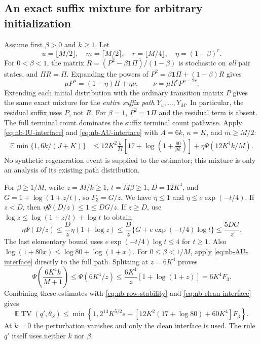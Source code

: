 \subsection{An exact suffix mixture for arbitrary initialization}
Assume first $\beta>0$ and $k\geq1$.  Let
\[
 u=\lfloor M/2\rfloor,\quad m=\lceil M/2\rceil,\quad
 r=\lfloor M/4\rfloor,\quad \eta=(1-\beta)^r.
\]
For $0<\beta<1$, the matrix
$R=(P^2-\beta\mathbf1\Pi)/(1-\beta)$ is stochastic on \emph{all}
pair states, and $\Pi R=\Pi$.  Expanding the powers of
$P^2=\beta\mathbf1\Pi+(1-\beta)R$ gives
\begin{equation}\label{eq:nb-suffix-mixture}
 \mu P^u=(1-\eta)\Pi+\eta\nu,
 \qquad \nu=\mu R^rP^{u-2r}.
\end{equation}
Extending each initial distribution with the ordinary transition matrix
$P$ gives the same exact mixture for the \emph{entire suffix path}
$Y_u,\ldots,Y_M$.  In particular, the residual suffix uses $P$, not $R$.
For $\beta=1$, $P^2=\mathbf1\Pi$ and the residual term is absent.
The full terminal count dominates the suffix terminal count pathwise.
Apply \eqref{eq:nb-IU-interface} and \eqref{eq:nb-AU-interface} with
$A=6k$, $\kappa=K$, and $m\geq M/2$:
\begin{align}\label{eq:nb-suffix-bound}
 \mathbb E\min\{1,6k/(J+K)\}
 &\leq12K^2\frac{k}{M}
 \left[17+\log\left(1+\frac{80}{\beta k}\right)\right]
 +\eta\Psi(12K^4k/M).
\end{align}
No synthetic regeneration event is supplied to the estimator; this
mixture is only an analysis of its existing path distribution.

For $\beta\geq1/M$, write $z=M/k\geq1$, $t=M\beta\geq1$,
$D=12K^4$, and $G=1+\log(1+z/t)$, so $F_3=G/z$.
We have $\eta\leq1$ and $\eta\leq e\exp(-t/4)$.
If $z<D$, then $\eta\Psi(D/z)\leq1\leq DG/z$.
If $z\geq D$, use
$\log z\leq\log(1+z/t)+\log t$ to obtain
\[
 \eta\Psi(D/z)\leq\frac Dz\eta(1+\log z)
 \leq\frac Dz\{G+e\exp(-t/4)\log t\}
 \leq\frac{5DG}{z}.
\]
The last elementary bound uses $e\exp(-t/4)\log t\leq4$ for $t\geq1$.
Also $\log(1+80x)\leq\log80+\log(1+x)$.
For $0\leq\beta<1/M$, apply \eqref{eq:nb-AU-interface} directly to
the full path.  Splitting at $z=6K^4$ proves
\[
 \Psi\left(\frac{6K^4k}{M+1}\right)
 \leq\Psi(6K^4/z)
 \leq\frac{6K^4}{z}[1+\log(1+z)]=6K^4F_3.
\]
Combining these estimates with \eqref{eq:nb-row-stability} and
\eqref{eq:nb-clean-interface} gives
\begin{equation}\label{eq:nb-final-upper}
 \mathbb E\operatorname{TV}(q',\theta_S)
 \leq\min\left\{1,2^{13}K^{5/2}s+
 [12K^2(17+\log80)+60K^4]F_3\right\}.
\end{equation}
At $k=0$ the perturbation vanishes and only the clean interface is used.
The rule $q'$ itself uses neither $k$ nor $\beta$.

